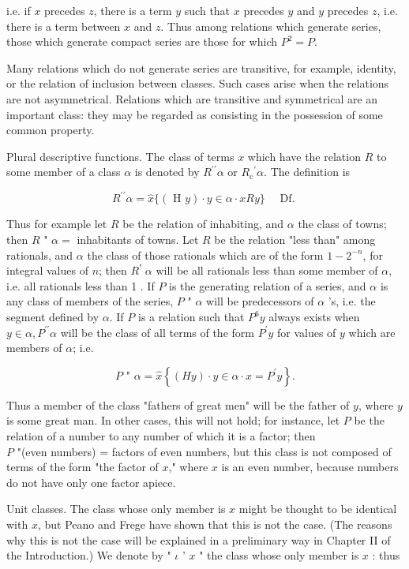 \documentclass[10pt]{article}
\begin{document}
i.e. if $x$ precedes $z$, there is a term $y$ such that $x$ precedes $y$ and $y$ precedes $z$, i.e. there is a term between $x$ and $z$. Thus among relations which generate series, those which generate compact series are those for which $P^{2}=P$.

Many relations which do not generate series are transitive, for example, identity, or the relation of inclusion between classes. Such cases arise when the relations are not asymmetrical. Relations which are transitive and symmetrical are an important class: they may be regarded as consisting in the possession of some common property.

Plural descriptive functions. The class of terms $x$ which have the relation $R$ to some member of a class $\alpha$ is denoted by $R^{\prime \prime} \alpha$ or $R_{\mathrm{c}}{ }^{\prime} \alpha$. The definition is

$$
R^{\prime \prime} \alpha=\widehat{x}\{(\text { H } y) \cdot y \in \alpha \cdot x R y\} \quad \text { Df. }
$$

Thus for example let $R$ be the relation of inhabiting, and $\alpha$ the class of towns; then $R$ " $\alpha=$ inhabitants of towns. Let $R$ be the relation "less than" among rationals, and $\alpha$ the class of those rationals which are of the form $1-2^{-n}$, for integral values of $n$; then $R^{\text {" }} \alpha$ will be all rationals less than some member of $\alpha$, i.e. all rationals less than 1 . If $P$ is the generating relation of a series, and $\alpha$ is any class of members of the series, $P$ " $\alpha$ will be predecessors of $\alpha$ 's, i.e. the segment defined by $\alpha$. If $P$ is a relation such that $P^{6} y$ always exists when $y \in \alpha, P^{\prime \prime} \alpha$ will be the class of all terms of the form $P^{\prime} y$ for values of $y$ which are members of $\alpha$; i.e.

$$
P \text { " } \alpha=\widehat{x}\left\{(H y) \cdot y \in \alpha \cdot x=P^{\prime} y\right\} .
$$

Thus a member of the class "fathers of great men" will be the father of $y$, where $y$ is some great man. In other cases, this will not hold; for instance, let $P$ be the relation of a number to any number of which it is a factor; then\\
$P$ "(even numbers) = factors of even numbers, but this class is not composed of terms of the form "the factor of $x$," where $x$ is an even number, because numbers do not have only one factor apiece.

Unit classes. The class whose only member is $x$ might be thought to be identical with $x$, but Peano and Frege have shown that this is not the case. (The reasons why this is not the case will be explained in a preliminary way in Chapter II of the Introduction.) We denote by " $\iota$ ' $x$ " the class whose only member is $x$ : thus
\end{document}
